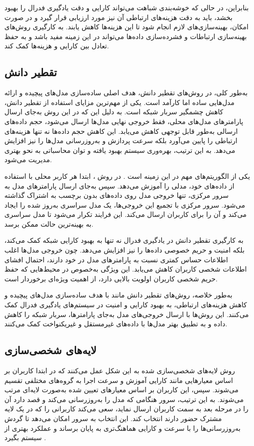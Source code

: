 بنابراین، در حالی که خوشه‌بندی شباهت می‌تواند کارایی و دقت یادگیری فدرال را بهبود بخشد، باید به دقت هزینه‌های ارتباطی آن نیز مورد ارزیابی قرار گیرد و در صورت امکان، بهینه‌سازی‌های لازم انجام شود تا این هزینه‌ها کاهش یابند. به کارگیری روش‌های بهینه‌سازی ارتباطات و فشرده‌سازی داده‌ها می‌تواند در این زمینه مفید باشد و به حفظ تعادل بین کارایی و هزینه‌ها کمک کند.


\subsection{
تقطیر دانش%
}
به‌طور کلی، در روش‌های تقطیر دانش، هدف اصلی ساده‌سازی مدل‌های پیچیده و ارائه مدل‌هایی ساده اما کارآمد است.
یکی از مهم‌ترین مزایای استفاده از تقطیر دانش، کاهش چشمگیر سربار شبکه است. به دلیل این که در این روش به‌جای ارسال پارامترهای مدل‌های محلی، فقط خروجی نهایی مدل‌ها ارسال می‌شود، حجم داده‌های ارسالی به‌طور قابل توجهی کاهش می‌یابد. این کاهش حجم داده‌ها نه تنها هزینه‌های ارتباطی را پایین می‌آورد بلکه سرعت پردازش و به‌روزرسانی مدل‌ها را نیز افزایش می‌دهد. به این ترتیب، بهره‌وری سیستم بهبود یافته و توان محاسباتی به نحو بهتری مدیریت می‌شود.

یکی از الگوریتم‌های مهم در این زمینه
%
است
\cite{itahara2021distillation}.
در روش
%
، ابتدا هر کاربر محلی با استفاده از داده‌های خود، مدلی را آموزش می‌دهد. سپس به‌جای ارسال پارامترهای مدل به سرور مرکزی، تنها خروجی مدل روی داده‌های بدون برچسب به اشتراک گذاشته می‌شود. سرور مرکزی با تجمیع این خروجی‌ها، یک مدل سراسری به‌روز شده را ایجاد می‌کند و آن را برای کاربران ارسال می‌کند. این فرایند تکرار می‌شود تا مدل سراسری به بهینه‌ترین حالت ممکن برسد.

به کارگیری تقطیر دانش در یادگیری فدرال نه تنها به بهبود کارایی شبکه کمک می‌کند، بلکه امنیت و حریم خصوصی داده‌ها را نیز افزایش می‌دهد. چون خروجی مدل‌ها اغلب اطلاعات حساس کمتری نسبت به پارامترهای مدل در خود دارند، احتمال افشای اطلاعات شخصی کاربران کاهش می‌یابد. این ویژگی به‌خصوص در محیط‌هایی که حفظ حریم شخصی کاربران اولویت بالایی دارد، از اهمیت ویژه‌ای برخوردار است.

به‌طور خلاصه، روش‌های تقطیر دانش مانند
با هدف ساده‌سازی مدل‌های پیچیده و کاهش هزینه‌های ارتباطی، به بهبود کارایی و امنیت در سیستم‌های یادگیری فدرال کمک می‌کنند. این روش‌ها با ارسال خروجی‌های مدل به‌جای پارامترها، سربار شبکه را کاهش داده و به تطبیق بهتر مدل‌ها با داده‌های غیرمستقل و غیریکنواخت کمک می‌کنند.


\subsection{
	لایه‌های شخصی‌سازی%
}
روش لایه‌های شخصی‌سازی شده به این شکل عمل می‌کنند که در ابتدا کاربران بر اساس معیارهایی مانند کارایی آموزش و سرعت اجرا به گروه‌های مختلفی تقسیم می‌شوند. سپس، این کاربران بر اساس معیارهای تعیین شده به‌صورت لایه‌ای مرتب می‌شوند. به این ترتیب، سرور هنگامی که مدل را به‌روزرسانی می‌کند و قصد دارد آن را در مرحله بعد به سمت کاربران ارسال نماید، سعی می‌کند کاربرانی را که در یک لایه مشترک حضور دارند انتخاب کند. این انتخاب به سرور امکان می‌دهد تا گردش به‌روزرسانی‌ها را با سرعت و کارایی هماهنگ‌تری به پایان برساند و عملکرد بهتری از سیستم بگیرد
\cite{chai2020tifl}.

